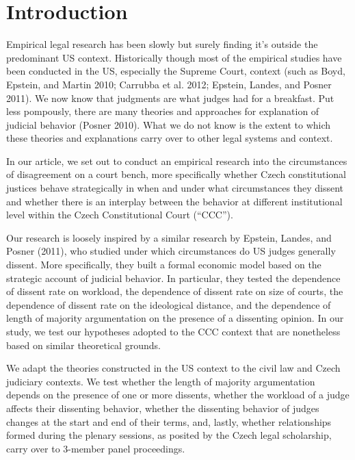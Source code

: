 \documentclass[
  11pt,
]{article}
\begin{document}
\vskip -8.5pt




\setlength{\parindent}{16pt}
\setlength{\parskip}{0pt}

\doublespacing
\vspace{25pt}

\hypertarget{introduction}{%
\section{Introduction}\label{introduction}}

Empirical legal research has been slowly but surely finding it's outside
the predominant US context. Historically though most of the empirical
studies have been conducted in the US, especially the Supreme Court,
context (such as Boyd, Epstein, and Martin 2010; Carrubba et al. 2012;
Epstein, Landes, and Posner 2011). We now know that judgments are what
judges had for a breakfast. Put less pompously, there are many theories
and approaches for explanation of judicial behavior (Posner 2010). What
we do not know is the extent to which these theories and explanations
carry over to other legal systems and context.

In our article, we set out to conduct an empirical research into the
circumstances of disagreement on a court bench, more specifically
whether Czech constitutional justices behave strategically in when and
under what circumstances they dissent and whether there is an interplay
between the behavior at different institutional level within the Czech
Constitutional Court (``CCC'').

Our research is loosely inspired by a similar research by Epstein,
Landes, and Posner (2011), who studied under which circumstances do US
judges generally dissent. More specifically, they built a formal
economic model based on the strategic account of judicial behavior. In
particular, they tested the dependence of dissent rate on workload, the
dependence of dissent rate on size of courts, the dependence of dissent
rate on the ideological distance, and the dependence of length of
majority argumentation on the presence of a dissenting opinion. In our
study, we test our hypotheses adopted to the CCC context that are
nonetheless based on similar theoretical grounds.

We adapt the theories constructed in the US context to the civil law and
Czech judiciary contexts. We test whether the length of majority
argumentation depends on the presence of one or more dissents, whether
the workload of a judge affects their dissenting behavior, whether the
dissenting behavior of judges changes at the start and end of their
terms, and, lastly, whether relationships formed during the plenary
sessions, as posited by the Czech legal scholarship, carry over to
3-member panel proceedings.
\end{document}
